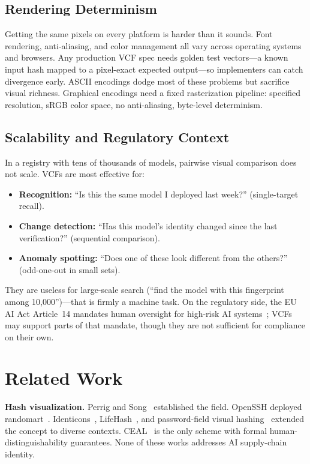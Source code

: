 \documentclass[conference,10pt]{IEEEtran}
\begin{document}
\subsection{Rendering Determinism}

Getting the same pixels on every platform is harder than it sounds.
Font rendering, anti-aliasing, and color management all vary across operating systems and browsers.
Any production VCF spec needs golden test vectors---a known input hash mapped to a pixel-exact expected output---so implementers can catch divergence early.
ASCII encodings dodge most of these problems but sacrifice visual richness.
Graphical encodings need a fixed rasterization pipeline: specified resolution, sRGB color space, no anti-aliasing, byte-level determinism.

\subsection{Scalability and Regulatory Context}

In a registry with tens of thousands of models, pairwise visual comparison does not scale.
VCFs are most effective for:

\begin{itemize}[leftmargin=*,nosep]
  \item \textbf{Recognition:} ``Is this the same model I deployed last week?'' (single-target recall).
  \item \textbf{Change detection:} ``Has this model's identity changed since the last verification?'' (sequential comparison).
  \item \textbf{Anomaly spotting:} ``Does one of these look different from the others?'' (odd-one-out in small sets).
\end{itemize}

They are useless for large-scale search (``find the model with this fingerprint among 10,000'')---that is firmly a machine task.
On the regulatory side, the EU AI Act Article~14 mandates human oversight for high-risk AI systems~\cite{euaiact2024}; VCFs may support parts of that mandate, though they are not sufficient for compliance on their own.

\section{Related Work}
\label{sec:related}

\noindent\textbf{Hash visualization.}
Perrig and Song~\cite{perrig1999hash} established the field.
OpenSSH deployed randomart~\cite{openssh2008release,loss2009drunken}.
Identicons~\cite{github2013identicons}, LifeHash~\cite{lifehash2021}, and password-field visual hashing~\cite{chromahash2009,vizhash2012,fietkau2020mosaic} extended the concept to diverse contexts.
CEAL~\cite{azimpourkivi2020human} is the only scheme with formal human-distinguishability guarantees.
None of these works addresses AI supply-chain identity.
\end{document}
